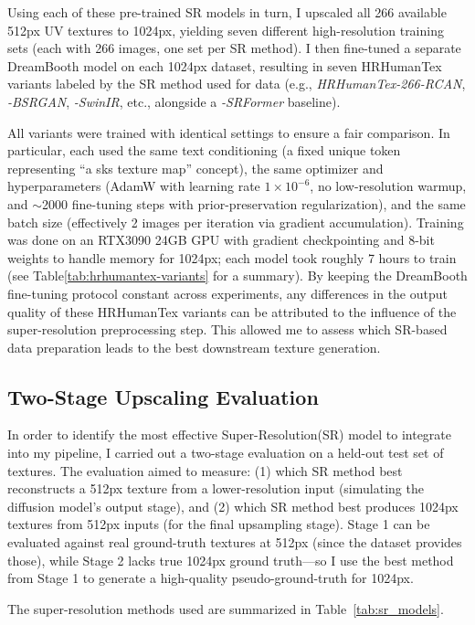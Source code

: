 Using each of these pre-trained SR models in turn, I upscaled all 266 available 512px UV textures to 1024px, yielding seven different high-resolution training sets (each with 266 images, one set per SR method). I then fine-tuned a separate DreamBooth model on each 1024px dataset, resulting in seven HRHumanTex variants labeled by the SR method used for data (e.g., \textit{HRHumanTex-266-RCAN}, \textit{-BSRGAN}, \textit{-SwinIR}, etc., alongside a \textit{-SRFormer} baseline). 

All variants were trained with identical settings to ensure a fair comparison. In particular, each used the same text conditioning (a fixed unique token representing “a sks texture map” concept), the same optimizer and hyperparameters (AdamW with learning rate $1\times10^{-6}$, no low-resolution warmup, and $\sim$2000 fine-tuning steps with prior-preservation regularization), and the same batch size (effectively 2 images per iteration via gradient accumulation). Training was done on an RTX3090 24GB GPU with gradient checkpointing and 8-bit weights to handle memory for 1024px; each model took roughly 7 hours to train (see Table\ref{tab:hrhumantex-variants} for a summary). By keeping the DreamBooth fine-tuning protocol constant across experiments, any differences in the output quality of these HRHumanTex variants can be attributed to the influence of the super-resolution preprocessing step. This allowed me to assess which SR-based data preparation leads to the best downstream texture generation.


\subsection{Two-Stage Upscaling Evaluation}

In order to identify the most effective Super-Resolution(SR) model to integrate into my pipeline, I carried out a two-stage evaluation on a held-out test set of textures. The evaluation aimed to measure: (1) which SR method best reconstructs a 512px texture from a lower-resolution input (simulating the diffusion model’s output stage), and (2) which SR method best produces 1024px textures from 512px inputs (for the final upsampling stage). Stage 1 can be evaluated against real ground-truth textures at 512px (since the dataset provides those), while Stage 2 lacks true 1024px ground truth—so I use the best method from Stage 1 to generate a high-quality pseudo-ground-truth for 1024px. 

The super-resolution methods used are summarized in Table~\ref{tab:sr_models}.

